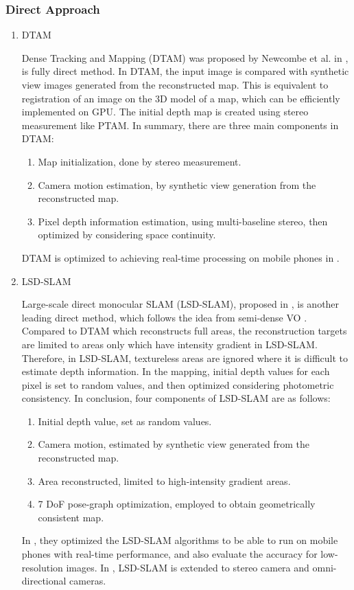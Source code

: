 \subsubsection{Direct Approach}
\begin{enumerate}[1.]
	\item DTAM
	
	Dense Tracking and Mapping (DTAM) was proposed by Newcombe et al. in \cite{newcombe2011dtam}, is fully direct method. In DTAM, the input image is compared with 
	synthetic view images generated from the reconstructed map. This is equivalent to registration of an image on the 3D model of a map, which can be efficiently implemented on GPU. The initial depth map is created using stereo measurement like PTAM. In summary, there are three main components in DTAM:
	
	\begin{enumerate}
		\item Map initialization, done by stereo measurement.
		\item Camera motion estimation, by synthetic view generation from the reconstructed map.
		\item Pixel depth information estimation, using multi-baseline stereo, then optimized by considering space continuity.
	\end{enumerate}
	
	DTAM is optimized to achieving real-time processing on mobile phones in \cite{ondruvska2015mobilefusion}.
	
	\item LSD-SLAM
	
	Large-scale direct monocular SLAM (LSD-SLAM), proposed in \cite{engel2014lsd}, is another leading direct method, which follows the idea from semi-dense VO \cite{engel2013semi}. Compared to DTAM which reconstructs full areas, the reconstruction targets are limited to areas only which have intensity gradient in LSD-SLAM. Therefore, in LSD-SLAM, textureless areas are ignored where it is difficult to estimate depth information. In the mapping, initial depth values for each pixel is set to random values, and then optimized considering photometric consistency. In conclusion, four components of LSD-SLAM are as follows:
	
	\begin{enumerate}
		\item Initial depth value, set as random values.
		\item Camera motion, estimated by synthetic view generated from the reconstructed map.
		\item Area reconstructed, limited to high-intensity gradient areas.
		\item 7 DoF pose-graph optimization, employed to obtain geometrically consistent map.
	\end{enumerate}
	
	In \cite{schops2014semi}, they optimized the LSD-SLAM algorithms to be able to run on mobile phones with real-time performance, and also evaluate the accuracy for low-resolution images. In \cite{caruso2015large, engel2015large}, LSD-SLAM is extended to stereo camera and omni-directional cameras.
\end{enumerate}

